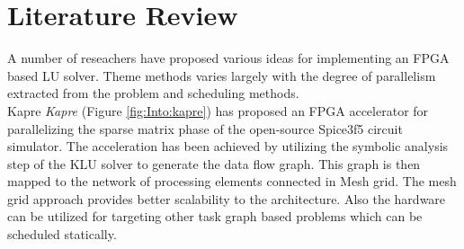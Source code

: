 \chapter{Literature Review}
\label{chapter:litRev}
A number of reseachers have proposed various ideas for implementing an 
FPGA based LU solver. Theme methods varies largely with the degree of parallelism 
extracted from the problem and scheduling methods. \\

Kapre \cite{Kapre} \textit{Kapre} (Figure \ref{fig:Into:kapre}) has proposed an FPGA accelerator for parallelizing
the sparse matrix phase of the open-source Spice3f5 circuit simulator. The acceleration
has been achieved by utilizing the symbolic analysis step of the KLU solver to generate
the data flow graph. This graph is then mapped to the network of processing elements 
connected in Mesh grid. The mesh grid approach provides better scalability to the 
architecture. Also the hardware can be utilized for targeting other task graph
based problems which can be scheduled statically. 

